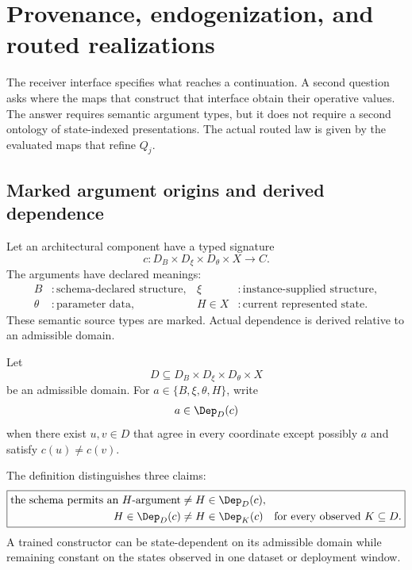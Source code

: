 \section{Provenance, endogenization, and routed realizations}\label{sec:provenance-routing}

The receiver interface specifies what reaches a continuation. A second question asks where the maps that construct that interface obtain their operative values. The answer requires semantic argument types, but it does not require a second ontology of state-indexed presentations. The actual routed law is given by the evaluated maps that refine $Q_j$.

\subsection{Marked argument origins and derived dependence}

Let an architectural component have a typed signature
\begin{equation}\label{eq:typed-component-signature}
c:
D_B\times D_\xi\times D_\theta\times X
\longrightarrow C.
\end{equation}
The arguments have declared meanings:
\[
\begin{aligned}
B&:\text{schema-declared structure},
&\xi&:\text{instance-supplied structure},\\
\theta&:\text{parameter data},
&H\in X&:\text{current represented state}.
\end{aligned}
\]
These semantic source types are marked. Actual dependence is derived relative to an admissible domain.

\begin{definition}\label{def:essential-dependence}
Let
\[
D\subseteq D_B\times D_\xi\times D_\theta\times X
\]
be an admissible domain. For $a\in\{B,\xi,\theta,H\}$, write
\[
a\in\Dep_D(c)
\]
when there exist $u,v\in D$ that agree in every coordinate except possibly $a$ and satisfy $c(u)\neq c(v)$.
\end{definition}

The definition distinguishes three claims:
\[
\boxed{
\begin{aligned}
\text{the schema permits an }H\text{-argument}
&\neq H\in\Dep_D(c),\\
H\in\Dep_D(c)
&\neq H\in\Dep_K(c)
\quad\text{for every observed }K\subseteq D.
\end{aligned}}
\]
A trained constructor can be state-dependent on its admissible domain while remaining constant on the states observed in one dataset or deployment window.


